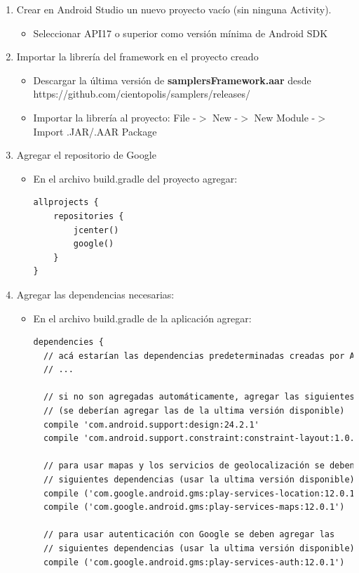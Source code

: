 \begin{enumerate}
	\item Crear en Android Studio un nuevo proyecto vacío (sin ninguna Activity).
		\begin{itemize}
		\item Seleccionar API17 o superior como versión mínima de Android SDK
		\end{itemize}
	\item Importar la librería del framework en el proyecto creado
		\begin{itemize}
		\item Descargar la última versión de \textbf{samplersFramework.aar} desde https://github.com/cientopolis/samplers/releases/
		\item Importar la librería al proyecto: File -$>$ New -$>$ New Module -$>$ Import .JAR/.AAR Package
		\end{itemize}
	\item Agregar el repositorio de Google
		\begin{itemize}
			\item En el archivo build.gradle del proyecto agregar: 
			\begin{lstlisting}[language=XML, frame=single]
allprojects {
    repositories {
        jcenter()
        google()
    }
}
			\end{lstlisting}	
		\end{itemize}
	\item Agregar las dependencias necesarias:
		\begin{itemize}
			\item En el archivo build.gradle de la aplicación agregar: 
			\begin{lstlisting}[language=XML, frame=tlb]
dependencies {
  // acá estarían las dependencias predeterminadas creadas por Android Studio:
  // ...

  // si no son agregadas automáticamente, agregar las siguientes dependencias:
  // (se deberían agregar las de la ultima versión disponible)
  compile 'com.android.support:design:24.2.1' 
  compile 'com.android.support.constraint:constraint-layout:1.0.2'

  // para usar mapas y los servicios de geolocalización se deben agregar las 
  // siguientes dependencias (usar la ultima versión disponible)
  compile ('com.google.android.gms:play-services-location:12.0.1')
  compile ('com.google.android.gms:play-services-maps:12.0.1')
  
  // para usar autenticación con Google se deben agregar las 
  // siguientes dependencias (usar la ultima versión disponible)  
  compile ('com.google.android.gms:play-services-auth:12.0.1')


\end{lstlisting}
\end{itemize}
\end{enumerate}
